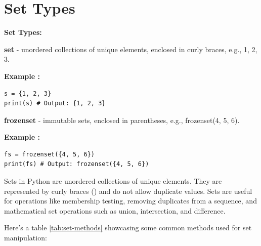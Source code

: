 \documentclass[12pt]{book}
\newtheorem{Example}{Example}[chapter]
\renewenvironment{Example}{\begin{trivlist}\item\relax
\textbf{Example \thesection: }}{\end{trivlist}}
\begin{document}
\section{Set Types}
\textbf{Set Types:}
\begin{itemize}
\item \textbf{set} - unordered collections of unique elements, enclosed in curly braces, e.g., {1, 2, 3}.
\begin{Example}
\begin{lstlisting}
s = {1, 2, 3}
print(s) # Output: {1, 2, 3}
\end{lstlisting}
\end{Example}

\item \textbf{frozenset} - immutable sets, enclosed in parentheses, e.g., frozenset({4, 5, 6}).
\begin{Example}
\begin{lstlisting}
fs = frozenset({4, 5, 6})
print(fs) # Output: frozenset({4, 5, 6})
\end{lstlisting}
\end{Example}
\end{itemize}

Sets in Python are unordered collections of unique elements. They are represented by curly braces ({}) and do not allow duplicate values. Sets are useful for operations like membership testing, removing duplicates from a sequence, and mathematical set operations such as union, intersection, and difference.

Here's a table \ref{tab:set-methods} showcasing some common methods used for set manipulation:
\end{document}
